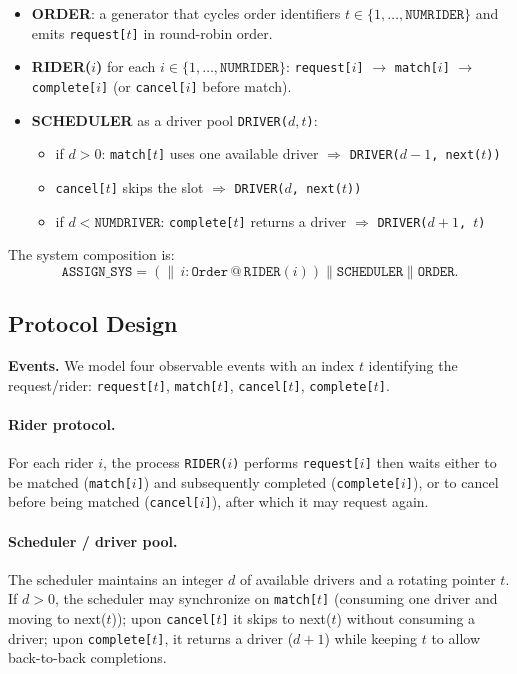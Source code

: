 \documentclass[11pt]{article}
\begin{document}
\begin{itemize}[leftmargin=1.5em]
  \item \textbf{ORDER}: a generator that cycles order identifiers $t \in \{1,\dots,\texttt{NUMRIDER}\}$ and emits \texttt{request[$t$]} in round-robin order.
  \item \textbf{RIDER($i$)} for each $i \in \{1,\dots,\texttt{NUMRIDER}\}$:
    \texttt{request[$i$]} $\rightarrow$ \texttt{match[$i$]} $\rightarrow$ \texttt{complete[$i$]} (or \texttt{cancel[$i$]} before match).
  \item \textbf{SCHEDULER} as a driver pool \texttt{DRIVER($d,t$)}:
    \begin{itemize}[leftmargin=1.2em]
      \item if $d>0$: \texttt{match[$t$]} uses one available driver $\Rightarrow$ \texttt{DRIVER($d{-}1$, next($t$))}
      \item \texttt{cancel[$t$]} skips the slot $\Rightarrow$ \texttt{DRIVER($d$, next($t$))}
      \item if $d<\texttt{NUMDRIVER}$: \texttt{complete[$t$]} returns a driver $\Rightarrow$ \texttt{DRIVER($d{+}1$, $t$)}
    \end{itemize}
\end{itemize}

\noindent The system composition is:
\[
\texttt{ASSIGN\_SYS} = \left(\parallel\, i:\texttt{Order}\, @\, \texttt{RIDER}(i)\right) \parallel \texttt{SCHEDULER} \parallel \texttt{ORDER}.
\]


\subsection{Protocol Design}

\textbf{Events.} We model four observable events with an index $t$ identifying the request/rider:
\texttt{request[$t$]}, \texttt{match[$t$]}, \texttt{cancel[$t$]}, \texttt{complete[$t$]}.

\paragraph{Rider protocol.}
For each rider $i$, the process \texttt{RIDER($i$)} performs \texttt{request[$i$]} then waits
either to be matched (\texttt{match[$i$]}) and subsequently completed (\texttt{complete[$i$]}),
or to cancel before being matched (\texttt{cancel[$i$]}), after which it may request again.

\paragraph{Scheduler / driver pool.}
The scheduler maintains an integer $d$ of available drivers and a rotating pointer $t$.
If $d>0$, the scheduler may synchronize on \texttt{match[$t$]} (consuming one driver and moving to next($t$));
upon \texttt{cancel[$t$]} it skips to next($t$) without consuming a driver; upon \texttt{complete[$t$]},
it returns a driver ($d{+}1$) while keeping $t$ to allow back-to-back completions.
\end{document}
